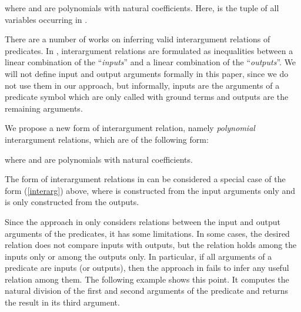 \documentclass[envcountsame]{tlp}
\newcounter{ex:der-lastsymconsctr}
\begin{document}
\noindent
where  and  are polynomials with natural
coefficients. Here,  is the tuple of all variables occurring in .


There are a number
of works on inferring valid interargument relations of predicates. In
\cite{Decorteetal98}, interargument relations are
formulated as inequalities between a linear
combination of the ``\textit{inputs}'' and a linear combination of the
``\textit{outputs}''. We will not define input and output arguments formally in this paper,
since we do not use them in our approach, but informally, inputs are the arguments of a
predicate symbol which are only called with ground terms and outputs are the remaining arguments.

We propose a new form of interargument relation, namely
\emph{polynomial}
interargument relations, which are of the following form: 

where  and  are polynomials with natural coefficients.

The form of interargument relations in \cite{Decorteetal98} can be
considered a special case of the form (\ref{interarg}) above, 
where  is constructed from the
input arguments only and  is only constructed from the
outputs.


Since the approach in \cite{Decorteetal98} only considers relations between
the input and output arguments of the predicates, it has
some limitations. In some cases, the desired relation does not compare
inputs with outputs, but the relation holds among the inputs only or among 
the outputs only. In particular, if all arguments of a predicate
are inputs (or outputs), then the approach in
\cite{Decorteetal98} fails to infer any useful relation among them. The following
example shows this point. It computes the natural division of the first and second
arguments of the predicate  and returns the result in its
third argument.
\end{document}
